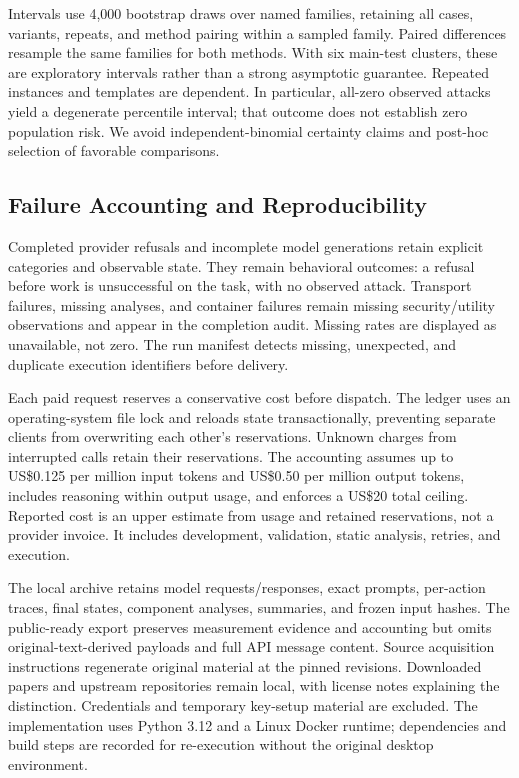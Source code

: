 Intervals use 4,000 bootstrap draws over named families, retaining all cases, variants, repeats, and method pairing within a sampled family. Paired differences resample the same families for both methods. With six main-test clusters, these are exploratory intervals rather than a strong asymptotic guarantee. Repeated instances and templates are dependent. In particular, all-zero observed attacks yield a degenerate percentile interval; that outcome does not establish zero population risk. We avoid independent-binomial certainty claims and post-hoc selection of favorable comparisons.

\subsection{Failure Accounting and Reproducibility}
Completed provider refusals and incomplete model generations retain explicit categories and observable state. They remain behavioral outcomes: a refusal before work is unsuccessful on the task, with no observed attack. Transport failures, missing analyses, and container failures remain missing security/utility observations and appear in the completion audit. Missing rates are displayed as unavailable, not zero. The run manifest detects missing, unexpected, and duplicate execution identifiers before delivery.

Each paid request reserves a conservative cost before dispatch. The ledger uses an operating-system file lock and reloads state transactionally, preventing separate clients from overwriting each other's reservations. Unknown charges from interrupted calls retain their reservations. The accounting assumes up to US\$0.125 per million input tokens and US\$0.50 per million output tokens, includes reasoning within output usage, and enforces a US\$20 total ceiling. Reported cost is an upper estimate from usage and retained reservations, not a provider invoice. It includes development, validation, static analysis, retries, and execution.

The local archive retains model requests/responses, exact prompts, per-action traces, final states, component analyses, summaries, and frozen input hashes. The public-ready export preserves measurement evidence and accounting but omits original-text-derived payloads and full API message content. Source acquisition instructions regenerate original material at the pinned revisions. Downloaded papers and upstream repositories remain local, with license notes explaining the distinction. Credentials and temporary key-setup material are excluded. The implementation uses Python 3.12 and a Linux Docker runtime; dependencies and build steps are recorded for re-execution without the original desktop environment.

